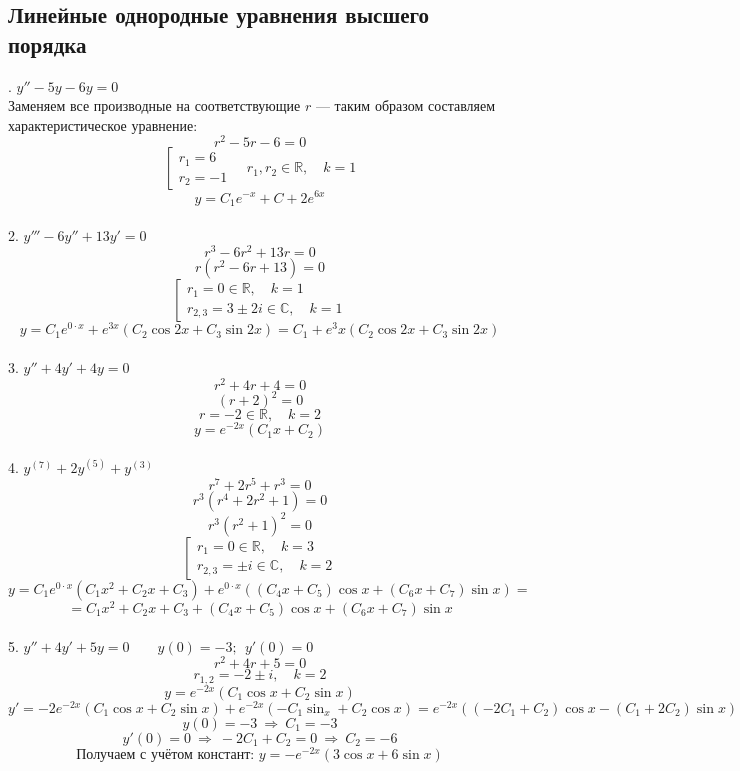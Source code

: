 \documentclass[a3paper,14pt]{article}
\begin{document}
\subsection*{\centering Линейные однородные уравнения высшего порядка}
. $y'' - 5y -6y = 0$\\
Заменяем все производные на соответствующие $r$ --- таким образом составляем характеристическое уравнение:
$$r^2-5r-6=0$$
$$\left[\begin{array}{l}
    r_1 = 6 \\ r_2 = -1
\end{array}\right.\quad r_1,r_2 \in \mathbb{R},\quad k = 1$$
$$y = C_1e^{-x}+C+2e^{6x}$$\,\\[0.5em]
2. $y'''-6y''+13y'=0$
$$r^3-6r^2+13r=0$$
$$r(r^2-6r+13)=0$$
$$\left[\begin{array}{l}
    r_1 = 0 \in \mathbb{R},\quad k=1 \\ r_{2,3} = 3 \pm 2i \in \mathbb{C},\quad k=1
\end{array}\right.$$
$$y=C_1e^{0\cdot x}+e^{3x}(C_2\cos2x+C_3\sin2x) = C_1 + e^3x(C_2\cos2x+C_3\sin2x)$$\,\\[0.5em]
3. $y''+4y'+4y=0$
$$r^2+4r+4 = 0$$
$$(r+2)^2 = 0$$
$$r = -2 \in \mathbb{R},\quad k=2$$
$$y = e^{-2x}(C_1x+C_2)$$\,\\[0.5em]
4. $y^{(7)}+2y^{(5)}+y^{(3)}$
$$r^7+2r^5+r^3=0$$
$$r^3(r^4+2r^2+1)=0$$
$$r^3(r^2 + 1)^2=0$$
$$\left[\begin{array}{l}
    r_1 = 0 \in \mathbb{R},\quad k = 3 \\
    r_{2,3}=\pm i \in \mathbb{C},\quad k = 2
\end{array}\right.$$
$$y=C_1e^{0\cdot x}(C_1x^2 + C_2x + C_3) + e^{0\cdot x}((C_4x + C_5)\cos x + (C_6x+C_7)\sin x) =$$
$$= C_1x^2 + C_2x + C_3 + (C_4x + C_5)\cos x + (C_6x+C_7)\sin x$$\,\\[0.5em]
5. $y''+4y'+5y = 0\qquad y(0) = -3;\ \ y'(0) = 0$
$$r^2+4r+5=0$$
$$r_{1, 2} = -2 \pm i,\quad k=2 $$
$$y = e^{-2x}(C_1\cos x+C_2\sin x)$$
$$y' = -2e^{-2x}(C_1\cos x+C_2\sin x)+e^{-2x}(-C_1\sin_x+C_2\cos x)=e^{-2x}((-2C_1+C_2)\cos x-(C_1+2C_2)\sin x)$$
$$y(0) =-3 \ \Rightarrow\  C_1 = -3$$
$$y'(0)=0 \ \Rightarrow\  -2C_1+C_2 = 0 \ \Rightarrow\  C_2 = -6$$
$$\text{Получаем с учётом констант: } y = -e^{-2x}(3\cos x + 6\sin x)$$
\end{document}
